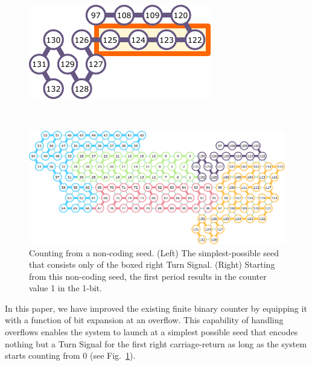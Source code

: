 \documentclass[twocolumn]{svjour3}
\begin{document}
\begin{figure}[tb]

\centering
\begin{minipage}{0.3\linewidth}
\centering
\includegraphics[width=\linewidth]{fig/svg/zeroBit01.pdf}
\end{minipage}
\begin{minipage}{0.05\linewidth}
\ \\
\end{minipage}
\begin{minipage}{0.55\linewidth}
\centering
\includegraphics[width=\linewidth]{fig/svg/zeroBit05.pdf}
\end{minipage}
\caption{Counting from a non-coding seed.
(Left) The simplest-possible seed that consists only of the boxed right Turn Signal. 
(Right) Starting from this non-coding seed, the first period results in the counter value 1 in the 1-bit. 
}
\label{fig:noncoding_seed}
\end{figure}

In this paper, we have improved the existing finite binary counter by equipping it with a function of bit expansion at an overflow.
This capability of handling overflows enables the system to launch at a simplest possible seed that encodes nothing but a Turn Signal for the first right carriage-return as long as the system starts counting from 0 (see Fig.~\ref{fig:noncoding_seed}). 
\end{document}

